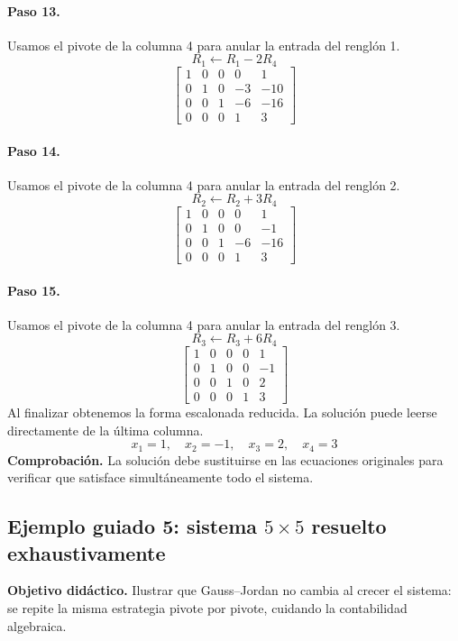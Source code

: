\documentclass[12pt]{article}
\theoremstyle{remark}
\begin{document}
\paragraph{Paso 13.} Usamos el pivote de la columna 4 para anular la entrada del renglón 1.
\[
R_{1}\leftarrow R_{1}-2R_{4}
\]
\[
\left[\begin{array}{cccc|c}
1 & 0 & 0 & 0 & 1\\
0 & 1 & 0 & -3 & -10\\
0 & 0 & 1 & -6 & -16\\
0 & 0 & 0 & 1 & 3
\end{array}\right]
\]
\paragraph{Paso 14.} Usamos el pivote de la columna 4 para anular la entrada del renglón 2.
\[
R_{2}\leftarrow R_{2}+3R_{4}
\]
\[
\left[\begin{array}{cccc|c}
1 & 0 & 0 & 0 & 1\\
0 & 1 & 0 & 0 & -1\\
0 & 0 & 1 & -6 & -16\\
0 & 0 & 0 & 1 & 3
\end{array}\right]
\]
\paragraph{Paso 15.} Usamos el pivote de la columna 4 para anular la entrada del renglón 3.
\[
R_{3}\leftarrow R_{3}+6R_{4}
\]
\[
\left[\begin{array}{cccc|c}
1 & 0 & 0 & 0 & 1\\
0 & 1 & 0 & 0 & -1\\
0 & 0 & 1 & 0 & 2\\
0 & 0 & 0 & 1 & 3
\end{array}\right]
\]
Al finalizar obtenemos la forma escalonada reducida. La solución puede leerse directamente de la última columna.
\[
\boxed{x_{1}=1,\quad x_{2}=-1,\quad x_{3}=2,\quad x_{4}=3}
\]
\textbf{Comprobación.} La solución debe sustituirse en las ecuaciones originales para verificar que satisface simultáneamente todo el sistema.

\subsection*{Ejemplo guiado 5: sistema $5\times5$ resuelto exhaustivamente}
\textbf{Objetivo didáctico.} Ilustrar que Gauss--Jordan no cambia al crecer el sistema: se repite la misma estrategia pivote por pivote, cuidando la contabilidad algebraica.
\end{document}
